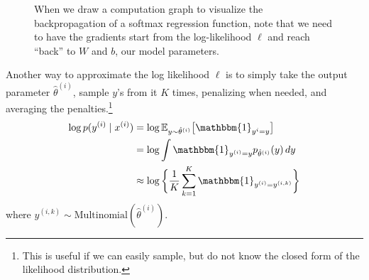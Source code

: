 \begin{example}[Softmax]
\begin{figure}[H]
      \caption{ When we draw a computation graph to visualize the backpropagation of a softmax regression function, note that we need to have the gradients start from the log-likelihood $\ell$ and reach ``back'' to $W$ and $b$, our model parameters. }
      \label{fig:softmax1}
    \end{figure}

    Another way to approximate the log likelihood $\ell$ is to simply take the output parameter $\hat{\theta}^{(i)}$, sample $y$'s from it $K$ times, penalizing when needed, and averaging the penalties.\footnote{This is useful if we can easily sample, but do not know the closed form of the likelihood distribution.}
    \begin{align}
      \log p(y^{(i)} \mid x^{(i)}) & = \log \mathbb{E}_{y \sim \hat{\theta}^{(i)}} \big[ \mathbbm{1}_{y^{i} = y} \big] \\
                                   & = \log \int \mathbbm{1}_{y^{(i)} = y} p_{\hat{\theta}^{(i)}} (y) \,dy \\
                                   & \approx \log \bigg\{ \frac{1}{K} \sum_{k=1}^K \mathbbm{1}_{y^{(i)} = y^{(i, k)}} \bigg\}
    \end{align}
    where $y^{(i, k)} \sim \mathrm{Multinomial} (\hat{\theta}^{(i)})$. 


\end{example}
